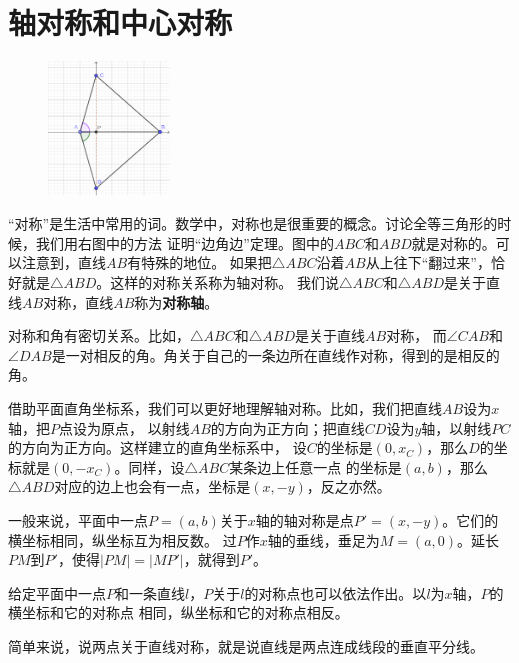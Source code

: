 \documentclass[12pt,UTF8]{ctexbook}
\begin{document}
\section{轴对称和中心对称}
\begin{figure} %
    \vspace{-30pt}
    \centering
    \includegraphics[width=0.288\textwidth]{坐标系3.png}
\end{figure}

“对称”是生活中常用的词。数学中，对称也是很重要的概念。讨论全等三角形的时候，我们用右图中的方法
证明“边角边”定理。图中的$ABC$和$ABD$就是对称的。可以注意到，直线$AB$有特殊的地位。
如果把$\triangle ABC$沿着$AB$从上往下“翻过来”，恰好就是$\triangle ABD$。这样的对称关系称为轴对称。
我们说$\triangle ABC$和$\triangle ABD$是关于直线$AB$对称，直线$AB$称为\textbf{对称轴}。

对称和角有密切关系。比如，$\triangle ABC$和$\triangle ABD$是关于直线$AB$对称，
而$\angle CAB$和$\angle DAB$是一对相反的角。角关于自己的一条边所在直线作对称，得到的是相反的角。

借助平面直角坐标系，我们可以更好地理解轴对称。比如，我们把直线$AB$设为$x$轴，把$P$点设为原点，
以射线$AB$的方向为正方向；把直线$CD$设为$y$轴，以射线$PC$的方向为正方向。这样建立的直角坐标系中，
设$C$的坐标是$(0, x_C)$，那么$D$的坐标就是$(0, -x_C)$。同样，设$\triangle ABC$某条边上任意一点
的坐标是$(a, b)$，那么$\triangle ABD$对应的边上也会有一点，坐标是$(x, -y)$，反之亦然。

一般来说，平面中一点$P = (a, b)$关于$x$轴的轴对称是点$P' = (x, -y)$。它们的横坐标相同，纵坐标互为相反数。
过$P$作$x$轴的垂线，垂足为$M = (a,0)$。延长$PM$到$P'$，使得$|PM| = |MP'|$，就得到$P'$。

给定平面中一点$P$和一条直线$l$，$P$关于$l$的对称点也可以依法作出。以$l$为$x$轴，$P$的横坐标和它的对称点
相同，纵坐标和它的对称点相反。

简单来说，说两点关于直线对称，就是说直线是两点连成线段的垂直平分线。
\end{document}
